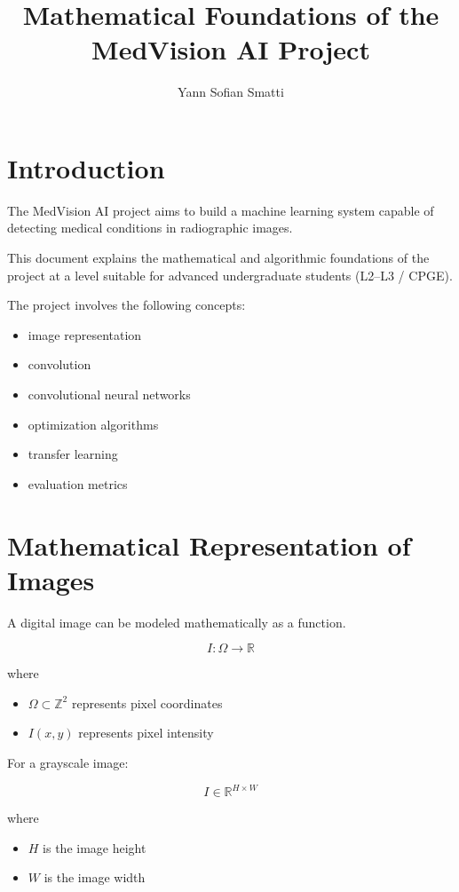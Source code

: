 ﻿\documentclass[11pt]{article}
\title{Mathematical Foundations of the MedVision AI Project}
\author{Yann Sofian Smatti}
\date{}
\begin{document}
\maketitle

\tableofcontents

\newpage

\section{Introduction}

The MedVision AI project aims to build a machine learning system capable of detecting medical conditions in radiographic images.

This document explains the mathematical and algorithmic foundations of the project at a level suitable for advanced undergraduate students (L2–L3 / CPGE).

The project involves the following concepts:

\begin{itemize}
\item image representation
\item convolution
\item convolutional neural networks
\item optimization algorithms
\item transfer learning
\item evaluation metrics
\end{itemize}

\section{Mathematical Representation of Images}

A digital image can be modeled mathematically as a function.

\[
I : \Omega \rightarrow \mathbb{R}
\]

where

\begin{itemize}
\item $\Omega \subset \mathbb{Z}^2$ represents pixel coordinates
\item $I(x,y)$ represents pixel intensity
\end{itemize}

For a grayscale image:

\[
I \in \mathbb{R}^{H \times W}
\]

where

\begin{itemize}
\item $H$ is the image height
\item $W$ is the image width
\end{itemize}
\end{document}
